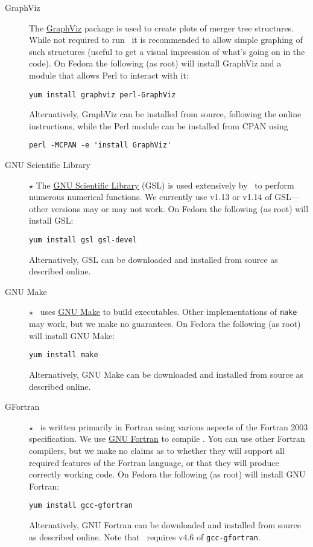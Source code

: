 \begin{description}
\item[GraphViz] The \href{http://www.graphviz.org/}{GraphViz} package is used to create plots of merger tree structures. While not required to run \glc\ it is recommended to allow simple graphing of such structures (useful to get a visual impression of what's going on in the code). On Fedora the following (as root) will install GraphViz and a module that allows Perl to interact with it:
\begin{verbatim}
yum install graphviz perl-GraphViz
\end{verbatim}
Alternatively, GraphViz can be installed from source, following the online instructions, while the Perl module can be installed from CPAN using
\begin{verbatim}
perl -MCPAN -e 'install GraphViz'
\end{verbatim}

 \item [GNU Scientific Library] $\star$ The \href{http://www.gnu.org/software/gsl/}{GNU Scientific Library} (GSL) is used extensively by \glc\ to perform numerous numerical functions. We currently use v1.13 or v1.14 of GSL---other versions may or may not work. On Fedora the following (as root) will install GSL:
\begin{verbatim}
yum install gsl gsl-devel
\end{verbatim}
Alternatively, GSL can be downloaded and installed from source as described online.

 \item [GNU Make] $\star$ \glc\ uses \href{http://www.gnu.org/software/make/}{GNU Make} to build executables. Other implementations of {\tt make} may work, but we make no guarantees. On Fedora the following (as root) will install GNU Make:
\begin{verbatim}
yum install make
\end{verbatim}
Alternatively, GNU Make can be downloaded and installed from source as described online.

 \item [GFortran] $\star$ \glc\ is written primarily in Fortran using various aspects of the Fortran 2003 specification. We use \href{http://gcc.gnu.org/fortran/}{GNU Fortran} to compile \glc. You can use other Fortran compilers, but we make no claims as to whether they will support all required features of the Fortran language, or that they will produce correctly working code. On Fedora the following (as root) will install GNU Fortran:
\begin{verbatim}
yum install gcc-gfortran
\end{verbatim}
Alternatively, GNU Fortran can be downloaded and installed from source as described online. Note that \glc\ requires v4.6 of {\tt gcc-gfortran}.


\end{description}
